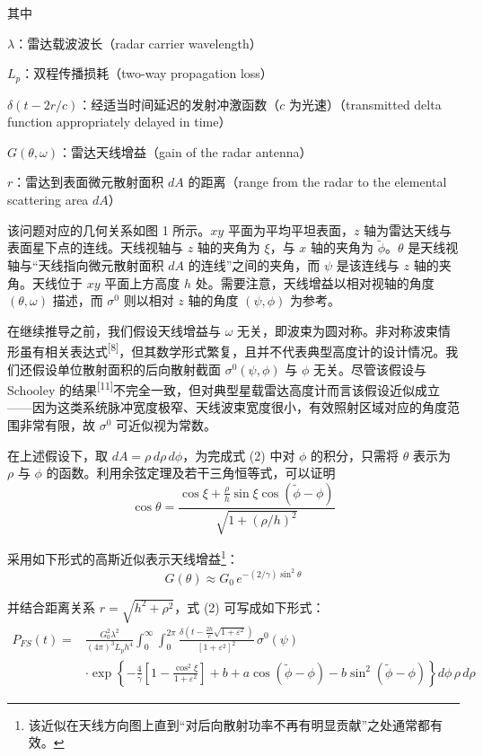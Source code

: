 
其中

$\lambda$：雷达载波波长（radar carrier wavelength）

$L_{p}$：双程传播损耗（two-way propagation loss）

$\delta(t - 2r/c)$：经适当时间延迟的发射冲激函数（$c$ 为光速）（transmitted delta function appropriately delayed in time）

$G(\theta,\omega)$：雷达天线增益（gain of the radar antenna）

$r$：雷达到表面微元散射面积 $dA$ 的距离（range from the radar to the elemental scattering area $dA$）

该问题对应的几何关系如图 1 所示。$xy$ 平面为平均平坦表面，$z$ 轴为雷达天线与表面星下点的连线。天线视轴与 $z$ 轴的夹角为 $\xi$，与 $x$ 轴的夹角为 $\widetilde{\phi}$。$\theta$ 是天线视轴与“天线指向微元散射面积 $dA$ 的连线”之间的夹角，而 $\psi$ 是该连线与 $z$ 轴的夹角。天线位于 $xy$ 平面上方高度 $h$ 处。需要注意，天线增益以相对视轴的角度 $(\theta,\omega)$ 描述，而 $\sigma^{0}$ 则以相对 $z$ 轴的角度 $(\psi,\phi)$ 为参考。

在继续推导之前，我们假设天线增益与 $\omega$ 无关，即波束为圆对称。非对称波束情形虽有相关表达式\textsuperscript{[8]}，但其数学形式繁复，且并不代表典型高度计的设计情况。我们还假设单位散射面积的后向散射截面 $\sigma^{0}(\psi,\phi)$ 与 $\phi$ 无关。尽管该假设与 Schooley 的结果\textsuperscript{[11]}不完全一致，但对典型星载雷达高度计而言该假设近似成立——因为这类系统脉冲宽度极窄、天线波束宽度很小，有效照射区域对应的角度范围非常有限，故 $\sigma^{0}$ 可近似视为常数。

在上述假设下，取 $dA = \rho\,d\rho\,d\phi$，为完成式 (2) 中对 $\phi$ 的积分，只需将 $\theta$ 表示为 $\rho$ 与 $\phi$ 的函数。利用余弦定理及若干三角恒等式，可以证明
\[
\cos\theta = \frac{\cos\xi + \frac{\rho}{h}\sin\xi\cos\!\left(\widetilde{\phi} - \phi\right)}{\sqrt{1 + \left(\rho/h\right)^{2}}}
\tag{3}
\]

采用如下形式的高斯近似表示天线增益\footnote{该近似在天线方向图上直到“对后向散射功率不再有明显贡献”之处通常都有效。}：
\[
G(\theta) \approx G_{0}\,e^{-(2/\gamma)\sin^{2}\theta}
\tag{4}
\]

并结合距离关系 $r = \sqrt{h^{2} + \rho^{2}}$，式 (2) 可写成如下形式：
\[
\begin{aligned}
P_{FS}(t) ={} & \frac{G_{0}^{2}\lambda^{2}}{(4\pi)^{3}L_{p}h^{4}}\int_{0}^{\infty}\!\!\int_{0}^{2\pi}\frac{\delta\!\left(t - \frac{2h}{c}\sqrt{1 + \varepsilon^{2}}\right)}{\left[1 + \varepsilon^{2}\right]^{2}}\,\sigma^{0}(\psi) \\
& \cdot \exp\left\{ -\frac{4}{\gamma}\left[1 - \frac{\cos^{2}\xi}{1 + \varepsilon^{2}}\right] + b + a\cos\!\left(\widetilde{\phi} - \phi\right) - b\sin^{2}\!\left(\widetilde{\phi} - \phi\right) \right\} d\phi\,\rho\,d\rho
\end{aligned}
\tag{5}
\]

